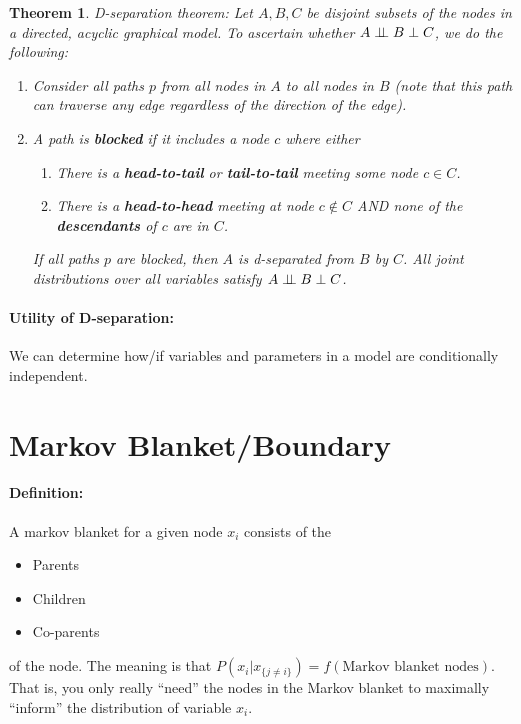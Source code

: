\documentclass[a4paper,12pt]{report}
\newtheorem{theorem}{Theorem}
\begin{document}
\begin{theorem}{D-separation theorem: }
Let $A,B,C$ be disjoint subsets of the nodes in a directed, acyclic graphical model.  To ascertain whether $A \perp\!\!\!\perp B \perp C$, we do the following:
\begin{enumerate}
\item Consider all paths $p$ from all nodes in $A$ to all nodes in $B$ (note that this path can traverse any edge regardless of the direction of the edge).
\item A path is \textbf{blocked} if it includes a node $c$ where either
\begin{enumerate}
\item There is a \textbf{head-to-tail} or \textbf{tail-to-tail} meeting some node $c\in C$.
\item There is a \textbf{head-to-head} meeting at node $c\notin C$ AND none of the \textbf{descendants} of $c$ are in $C$.
\end{enumerate}

If all paths $p$ are blocked, then $A$ is d-separated from $B$ by $C$. All joint distributions over all variables satisfy $A \perp\!\!\!\perp B \perp C$.
\end{enumerate}
\end{theorem}

\paragraph{Utility of D-separation: } We can determine how/if variables and parameters in a model are conditionally independent.


\section{Markov Blanket/Boundary}

\paragraph{Definition: } A markov blanket for a given node $x_i$ consists of the 
\begin{itemize}
\item Parents
\item Children
\item Co-parents
\end{itemize}
of the node. The meaning is that $P(x_i|x_{\{j\neq i\}}) = f(\text{Markov blanket nodes})$. That is, you only really ``need'' the nodes in the Markov blanket to maximally ``inform'' the distribution of variable $x_i$.
\end{document}
